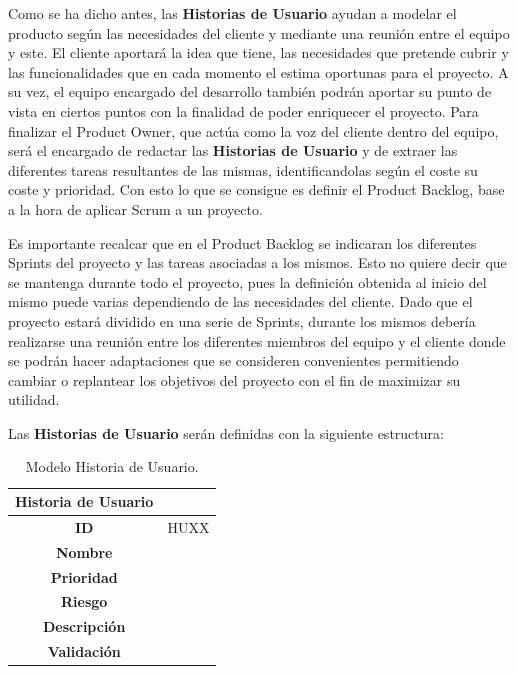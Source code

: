 Como se ha dicho antes, las \textbf{Historias de Usuario} ayudan a modelar el producto según las necesidades del cliente y mediante una reunión entre el equipo y este. El cliente aportará la idea que tiene, las necesidades que pretende cubrir y las funcionalidades que en cada momento el estima oportunas para el proyecto. A su vez, el equipo encargado del desarrollo también podrán aportar su punto de vista en ciertos puntos con la finalidad de poder enriquecer el proyecto. Para finalizar el Product Owner, que actúa como la voz del cliente dentro del equipo, será el encargado de redactar las \textbf{Historias de Usuario} y de extraer las diferentes tareas resultantes de las mismas, identificandolas según el coste su coste y prioridad. Con esto lo que se consigue es definir el Product Backlog, base a la hora de aplicar Scrum a un proyecto.

Es importante recalcar que en el Product Backlog se indicaran los diferentes Sprints del proyecto y las tareas asociadas a los mismos. Esto no quiere decir que se mantenga durante todo el proyecto, pues la definición obtenida al inicio del mismo puede varias dependiendo de las necesidades del cliente. Dado que el proyecto estará dividido en una serie de Sprints, durante los mismos debería realizarse una reunión entre los diferentes miembros del equipo y el cliente donde se podrán hacer adaptaciones que se consideren convenientes permitiendo cambiar o replantear los objetivos del proyecto con el fin de maximizar su utilidad.

Las \textbf{Historias de Usuario} serán definidas con la siguiente estructura:

\begin{table}[H]
	\begin{center}
		\begin{tabular}{| c | p{9cm} |}
			\hline
			
			Historia de Usuario &  \\ \hline
			
			
			\textbf{ID} & HUXX \\
			\textbf{Nombre} &  \\
			\textbf{Prioridad} &  \\
			\textbf{Riesgo} &  \\
			\textbf{Descripción} &  \\
			\textbf{Validación} &  \\ \hline
		\end{tabular}
		\caption{Modelo Historia de Usuario.}
	\end{center}
\end{table}

